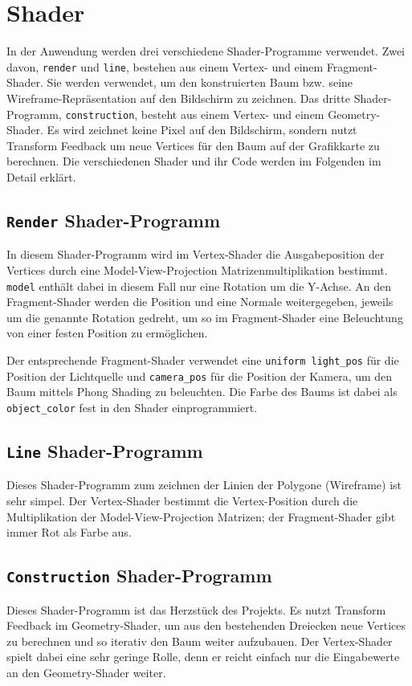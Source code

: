 \chapter{Shader}
In der Anwendung werden drei verschiedene Shader-Programme verwendet. Zwei davon, \lstinline{render} und \lstinline{line}, bestehen aus einem Vertex- und einem Fragment-Shader. Sie werden verwendet, um den konstruierten Baum bzw. seine Wireframe-Repräsentation auf den Bildschirm zu zeichnen. Das dritte Shader-Programm, \lstinline{construction}, besteht aus einem Vertex- und einem Geometry-Shader. Es wird zeichnet keine Pixel auf den Bildschirm, sondern nutzt Transform Feedback um neue Vertices für den Baum auf der Grafikkarte zu berechnen. Die verschiedenen Shader und ihr Code werden im Folgenden im Detail erklärt.

\section{\lstinline{Render} Shader-Programm}
In diesem Shader-Programm wird im Vertex-Shader die Ausgabeposition der Vertices durch eine Model-View-Projection Matrizenmultiplikation bestimmt. \lstinline{model} enthält dabei in diesem Fall nur eine Rotation um die Y-Achse. An den Fragment-Shader werden die Position und eine Normale weitergegeben, jeweils um die genannte Rotation gedreht, um so im Fragment-Shader eine Beleuchtung von einer festen Position zu ermöglichen.

Der entsprechende Fragment-Shader verwendet eine \lstinline{uniform light_pos} für die Position der Lichtquelle und \lstinline{camera_pos} für die Position der Kamera, um den Baum mittels Phong Shading zu beleuchten. Die Farbe des Baums ist dabei als \lstinline{object_color} fest in den Shader einprogrammiert.

\section{\lstinline{Line} Shader-Programm}
Dieses Shader-Programm zum zeichnen der Linien der Polygone (Wireframe) ist sehr simpel. Der Vertex-Shader bestimmt die Vertex-Position durch die Multiplikation der Model-View-Projection Matrizen; der Fragment-Shader gibt immer Rot als Farbe aus.

\section{\lstinline{Construction} Shader-Programm}
Dieses Shader-Programm ist das Herzstück des Projekts. Es nutzt Transform Feedback im Geometry-Shader, um aus den bestehenden Dreiecken neue Vertices zu berechnen und so iterativ den Baum weiter aufzubauen. Der Vertex-Shader spielt dabei eine sehr geringe Rolle, denn er reicht einfach nur die Eingabewerte an den Geometry-Shader weiter.

